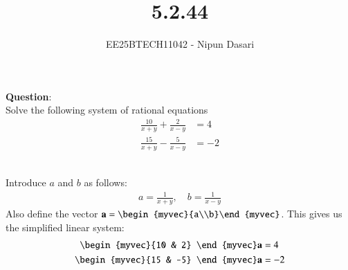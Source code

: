 \documentclass[journal]{IEEEtran}
\begin{document}
	
	
	\vspace{3cm}
	
	\title{5.2.44}
	\author{EE25BTECH11042 - Nipun Dasari}
	\maketitle
	
	\renewcommand{\thefigure}{\theenumi}
	\renewcommand{\thetable}{\theenumi}
	\setlength{\intextsep}{10pt}
	
	\renewcommand{\thetable}{\theenumi}
	
	\textbf{Question}:\\
	Solve the following system of rational equations
	\begin{align}
		\frac{10}{x+y}+\frac{2}{x-y} &= 4 \\
		\frac{15}{x+y}-\frac{5}{x-y} &= -2
	\end{align}
	
	\solution \\
	Introduce $a$ and $b$ as follows:
	\begin{align}
		a = \frac{1}{x+y}, \quad b = \frac{1}{x-y}
	\end{align}
	Also define the vector $\vec{a} = \begin{myvec}{a\\b}\end{myvec}$. This gives us the simplified linear system:
	\begin{align}
		\begin{myvec}{10 & 2} \end{myvec}\vec{a} &= 4 \\
		\begin{myvec}{15 & -5} \end{myvec}\vec{a} &= -2
	\end{align}
	
\end{document}
